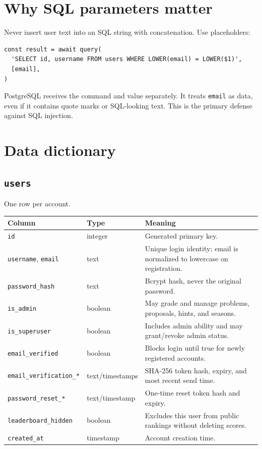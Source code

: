 \documentclass[11pt,oneside]{book}
\newcommand{\code}[1]{\texttt{#1}}
\begin{document}
\section{Why SQL parameters matter}
Never insert user text into an SQL string with concatenation. Use placeholders:

\begin{lstlisting}
const result = await query(
  'SELECT id, username FROM users WHERE LOWER(email) = LOWER($1)',
  [email],
)
\end{lstlisting}

PostgreSQL receives the command and value separately. It treats \code{email} as data, even if it contains quote marks or SQL-looking text. This is the primary defense against SQL injection.

\section{Data dictionary}

\subsection{\code{users}}
One row per account.
\begin{longtable}{p{} p{} p{}}
\toprule
Column & Type & Meaning \\
\midrule
\endhead
\code{id} & integer & Generated primary key. \\
\code{username}, \code{email} & text & Unique login identity; email is normalized to lowercase on registration. \\
\code{password\_hash} & text & Bcrypt hash, never the original password. \\
\code{is\_admin} & boolean & May grade and manage problems, proposals, hints, and seasons. \\
\code{is\_superuser} & boolean & Includes admin ability and may grant/revoke admin status. \\
\code{email\_verified} & boolean & Blocks login until true for newly registered accounts. \\
\code{email\_verification\_*} & text/timestamps & SHA-256 token hash, expiry, and most recent send time. \\
\code{password\_reset\_*} & text/timestamp & One-time reset token hash and expiry. \\
\code{leaderboard\_hidden} & boolean & Excludes this user from public rankings without deleting scores. \\
\code{created\_at} & timestamp & Account creation time. \\
\bottomrule
\end{longtable}
\end{document}
